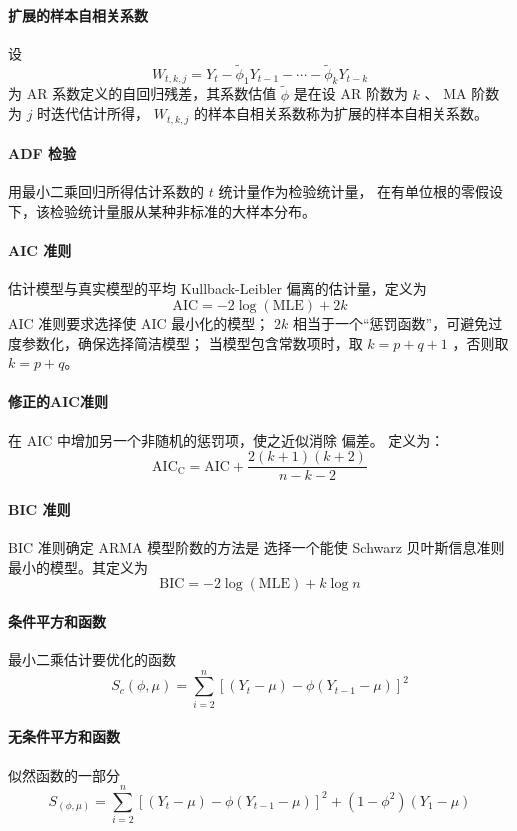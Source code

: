 \documentclass[UTF8,hyperref,a4paper]{ctexart}
\begin{document}
        \paragraph{扩展的样本自相关系数} 设 
        $$ W_{t,k,j} = Y_t - \tilde{\phi}_1 Y_{t-1} - \cdots - \tilde{\phi}_k Y_{t-k}  $$
        为 AR 系数定义的自回归残差，其系数估值 $ \tilde{\phi} $ 是在设 AR 阶数为 $ k $ 、
        MA 阶数为 $ j $ 时迭代估计所得， $ W_{t,k,j} $ 的样本自相关系数称为扩展的样本自相关系数。

        \paragraph{ADF 检验} 用最小二乘回归所得估计系数的 $ t $ 统计量作为检验统计量，
        在有单位根的零假设下，该检验统计量服从某种非标准的大样本分布。

        \paragraph{AIC 准则} 估计模型与真实模型的平均 Kullback-Leibler 偏离的估计量，定义为
        $$ \mathrm{AIC} = -2 \log(\mathrm{MLE}) + 2k $$
        AIC 准则要求选择使 AIC 最小化的模型；
        $ 2k $ 相当于一个“惩罚函数”，可避免过度参数化，确保选择简洁模型；
        当模型包含常数项时，取 $ k = p + q + 1 $ ，否则取 $ k = p + q $。

        \paragraph{修正的AIC准则} 在 AIC 中增加另一个非随机的惩罚项，使之近似消除 偏差。
        定义为： $$ \mathrm{AIC_C} = \mathrm{AIC} + \frac{2(k+1)(k+2)}{n-k-2} $$

        \paragraph{BIC 准则} BIC 准则确定 ARMA 模型阶数的方法是
        选择一个能使 Schwarz 贝叶斯信息准则最小的模型。其定义为
        $$ \mathrm{BIC} = -2 \log(\mathrm{MLE}) + k \log{n} $$

        \paragraph{条件平方和函数} 最小二乘估计要优化的函数
        $$ S_c(\phi, \mu) = \sum _{i=2}^{n} [(Y_t - \mu) - \phi (Y_{t-1} - \mu)]^2 $$
        
        \paragraph{无条件平方和函数} 似然函数的一部分
        $$ S_(\phi, \mu) = \sum _{i=2}^{n} [(Y_t - \mu) - \phi (Y_{t-1} - \mu)]^2
                         + (1 - \phi^2)(Y_1 - \mu) $$
        
\end{document}
